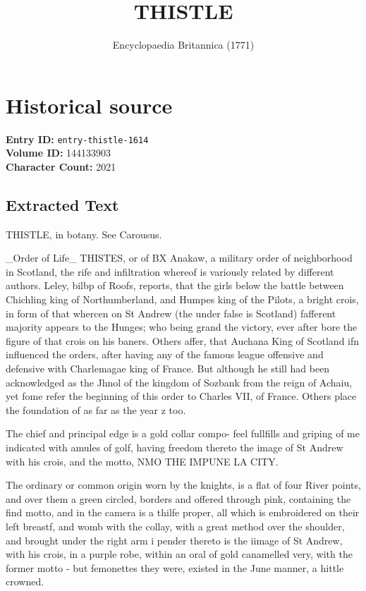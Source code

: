 \documentclass{article}
\title{THISTLE}
\date{Encyclopaedia Britannica (1771)}
\begin{document}
\maketitle

\section*{Historical source}
\textbf{Entry ID:} \texttt{entry-thistle-1614} \\
\textbf{Volume ID:} 144133903 \\
\textbf{Character Count:} 2021

\subsection*{Extracted Text}
THISTLE, in botany. See Carousus.

\_Order of Life\_ THISTES, or of BX Anakaw, a military order of neighborhood in Scotland, the rife and infiltration whereof is variously related by different authors. Leley, bilbp of Roofs, reports, that the girls below the battle between Chichling king of Northumberland, and Humpes king of the Pilots, a bright crois, in form of that whercen on St Andrew (the under false is Scotland) fafferent majority appears to the Hunges; who being grand the victory, ever after bore the figure of that crois on his baners. Others affer, that Auchana King of Scotland ifn influenced the orders, after having any of the famous league offensive and defensive with Charlemagae king of France. But although he still had been acknowledged as the Jhnol of the kingdom of Sozbank from the reign of Achaiu, yet fome refer the beginning of this order to Charles VII, of France. Others place the foundation of as far as the year z too.

The chief and principal edge is a gold collar compo- feel fullfills and griping of me indicated with amules of golf, having freedom thereto the image of St Andrew with his crois, and the motto, NMO THE IMPUNE LA CITY.

The ordinary or common origin worn by the knights, is a flat of four River points, and over them a green circled, borders and offered through pink, containing the find motto, and in the camera is a thilfe proper, all which is embroidered on their left breastf, and womb with the collay, with a great method over the shoulder, and brought under the right arm i pender thereto is the iimage of St Andrew, with his crois, in a purple robe, within an oral of gold canamelled very, with the former motto - but femonettes they were, existed in the June manner, a hittle crowned.
\end{document}
